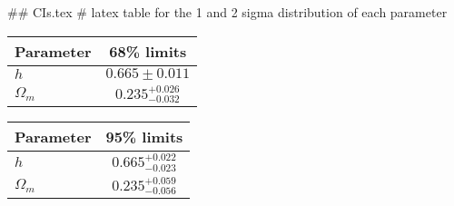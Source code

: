 ## CIs.tex
# latex table for the 1 and 2 sigma distribution of each parameter

\begin{tabular} { l  c}
 Parameter &  68\% limits\\
\hline
{\boldmath$h              $} & $0.665\pm 0.011            $\\
{\boldmath$\Omega_m       $} & $0.235^{+0.026}_{-0.032}   $\\
\hline
\end{tabular}

\begin{tabular} { l  c}
 Parameter &  95\% limits\\
\hline
{\boldmath$h              $} & $0.665^{+0.022}_{-0.023}   $\\
{\boldmath$\Omega_m       $} & $0.235^{+0.059}_{-0.056}   $\\
\hline
\end{tabular}
